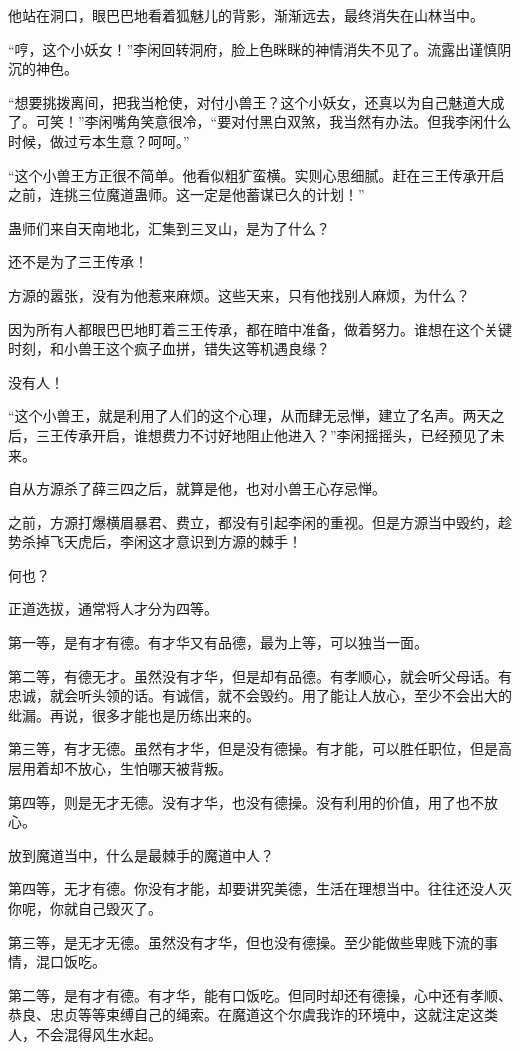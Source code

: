 \begin{this_body}
他站在洞口，眼巴巴地看着狐魅儿的背影，渐渐远去，最终消失在山林当中。

“哼，这个小妖女！”李闲回转洞府，脸上色眯眯的神情消失不见了。流露出谨慎阴沉的神色。

“想要挑拨离间，把我当枪使，对付小兽王？这个小妖女，还真以为自己魅道大成了。可笑！”李闲嘴角笑意很冷，“要对付黑白双煞，我当然有办法。但我李闲什么时候，做过亏本生意？呵呵。”

“这个小兽王方正很不简单。他看似粗犷蛮横。实则心思细腻。赶在三王传承开启之前，连挑三位魔道蛊师。这一定是他蓄谋已久的计划！”

蛊师们来自天南地北，汇集到三叉山，是为了什么？

还不是为了三王传承！

方源的嚣张，没有为他惹来麻烦。这些天来，只有他找别人麻烦，为什么？

因为所有人都眼巴巴地盯着三王传承，都在暗中准备，做着努力。谁想在这个关键时刻，和小兽王这个疯子血拼，错失这等机遇良缘？

没有人！

“这个小兽王，就是利用了人们的这个心理，从而肆无忌惮，建立了名声。两天之后，三王传承开启，谁想费力不讨好地阻止他进入？”李闲摇摇头，已经预见了未来。

自从方源杀了薛三四之后，就算是他，也对小兽王心存忌惮。

之前，方源打爆横眉暴君、费立，都没有引起李闲的重视。但是方源当中毁约，趁势杀掉飞天虎后，李闲这才意识到方源的棘手！

何也？

正道选拔，通常将人才分为四等。

第一等，是有才有德。有才华又有品德，最为上等，可以独当一面。

第二等，有德无才。虽然没有才华，但是却有品德。有孝顺心，就会听父母话。有忠诚，就会听头领的话。有诚信，就不会毁约。用了能让人放心，至少不会出大的纰漏。再说，很多才能也是历练出来的。

第三等，有才无德。虽然有才华，但是没有德操。有才能，可以胜任职位，但是高层用着却不放心，生怕哪天被背叛。

第四等，则是无才无德。没有才华，也没有德操。没有利用的价值，用了也不放心。

放到魔道当中，什么是最棘手的魔道中人？

第四等，无才有德。你没有才能，却要讲究美德，生活在理想当中。往往还没人灭你呢，你就自己毁灭了。

第三等，是无才无德。虽然没有才华，但也没有德操。至少能做些卑贱下流的事情，混口饭吃。

第二等，是有才有德。有才华，能有口饭吃。但同时却还有德操，心中还有孝顺、恭良、忠贞等等束缚自己的绳索。在魔道这个尔虞我诈的环境中，这就注定这类人，不会混得风生水起。


\end{this_body}
